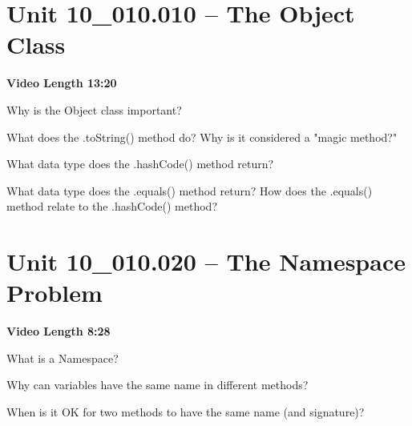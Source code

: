 \documentclass[letterpaper,12pt]{exam}
\newcommand{\unit}{Unit 10}
\begin{document}
\section*{\unit\_010.010 -- The Object Class} 
\par{\selectfont\textbf{Video Length 13:20}}
\begin{questions}
\begin{samepage}
    \question Why is the Object class important?
    \vspace{5mm}
\end{samepage}
\begin{samepage}
    \question What does the .toString() method do?  Why is it considered a "magic method?"
    \vspace{5mm}
\end{samepage}

\begin{samepage}
    \question What data type does the .hashCode() method return?
    \vspace{5mm}
\end{samepage}

\begin{samepage}
    \question What data type does the .equals() method return?  How does the .equals() method relate to the .hashCode() method?
    \vspace{5mm}
\end{samepage}

\section*{\unit\_010.020 -- The Namespace Problem} 
\par{\selectfont\textbf{Video Length 8:28 }}

\begin{samepage}
    \question What is a Namespace?
    \vspace{5mm}
\end{samepage}

\begin{samepage}
    \question Why can variables have the same name in different methods?
    \vspace{5mm}
\end{samepage}

\begin{samepage}
    \question When is it OK for two methods to have the same name (and signature)?
    \vspace{5mm}
\end{samepage}


\end{questions}
\end{document}
